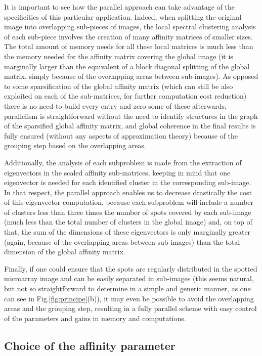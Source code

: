 \documentclass[runningheads,a4paper]{llncs}
\begin{document}
It is important to see how the parallel approach can take advantage of the
specificities of this particular application. Indeed, when splitting the
original image into overlapping sub-pieces of images, the local spectral
clustering analysis of each sub-piece involves the creation of many affinity
matrices of smaller sizes. The total amount of memory needs for all these
local matrices is much less than the memory needed for the affinity matrix
covering the global image (it is marginally larger than the equivalent of a
block diagonal splitting of the global matrix, simply because of the
overlapping areas between sub-images).
As opposed to some sparsification of the global affinity matrix (which can
still be also exploited on each of the sub-ma\-tri\-ces, for further
computation cost reduction) there is no need to build every entry and zero
some of these afterwards, parallelism is straightforward without the need to
identify structures in the graph of the sparsified global affinity matrix,
and global coherence in the final results is fully ensured (without any
aspects of approximation theory)  because of the grouping step based
on the overlapping areas.

Additionally, the analysis of each subproblem is made from the extraction of
eigenvectors in the scaled affinity sub-matrices, keeping in mind that one
eigenvector is needed for each identified cluster in the corresponding
sub-image. In that respect, the parallel approach enables us to decrease
drastically the cost of this eigenvector computation, because each subproblem
will include a number of clusters less than three times the number of spots
covered by each sub-image (much less than the total number of clusters in the
global image) and, on top of that, the sum of the dimensions of these
eigenvectors is only marginally greater (again, because of the overlapping
areas between sub-images) than the total dimension of the global affinity
matrix.

Finally, if one could ensure that the spots are regularly distributed in the
spotted microarray image and can be easily separated in sub-images (this seems
natural, but not so straightforward to determine in a simple and generic
manner, as one can see in Fig.\ref{fig:principe}(b)), it may even be possible
to avoid the overlapping areas and the grouping step, resulting in a fully
parallel scheme with easy control of the parameters and gains in memory and
computations.

\subsection{Choice of the affinity parameter}
\end{document}
